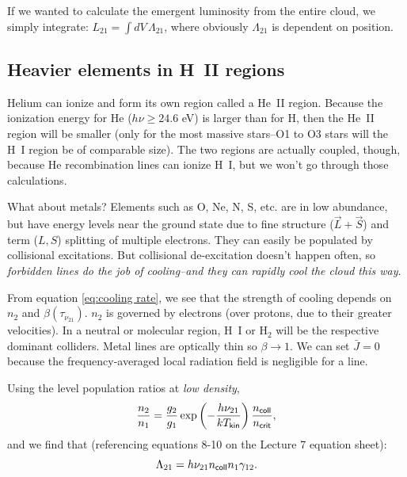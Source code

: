 \documentclass{tufte-handout}
\renewcommand{\rm}{\sf}
\newcommand{\HI}{\textnormal{H{\smaller~\textsc{I}}}}
\newcommand{\HII}{\textnormal{H{\smaller~\textsc{II}}}}
\renewcommand{\smallcaps}[1]{{\smaller~\textsc{#1}}}
\newcommand{\spec}[2]{\textnormal{#1}\smallcaps{#2}} %
\begin{document}
If we wanted to calculate the emergent luminosity from the entire cloud, we simply integrate: $L_{21} = \int dV\, \Lambda_{21}$, where obviously $\Lambda_{21}$ is dependent on position.

\subsection{Heavier elements in \HII{} regions}
Helium can ionize and form its own region called a \spec{He}{II} region. Because the ionization energy for He ($h\nu \geq 24.6$ eV) is larger than for H, then the \spec{He}{II} region will be smaller (only for the most massive stars--O1 to O3 stars will the \HI{} region be of comparable size). The two regions are actually coupled, though, because He recombination lines can ionize \HI, but we won't go through those calculations.

What about metals? Elements such as O, Ne, N, S, etc. are in low abundance, but have energy levels near the ground state due to fine structure ($\vec L + \vec S$) and term ($L, S$) splitting of multiple electrons. They can easily be populated by collisional excitations. But collisional de-excitation doesn't happen often, so \textit{forbidden lines do the job of cooling--and they can rapidly cool the cloud this way}.

From equation \eqref{eq:cooling rate}, we see that the strength of cooling depends on $n_2$ and $\beta(\tau_{\nu_{21}})$. $n_2$ is governed by electrons (over protons, due to their greater velocities). In a neutral or molecular region, \HI{} or H$_2$ will be the respective dominant colliders. Metal lines are optically thin so $\beta \rightarrow 1$. We can set $\bar J = 0$ because the frequency-averaged local radiation field is negligible for a line. 

Using the level population ratios at \textit{low density}, 
\begin{equation}
\frac{n_2}{n_1} = \frac{g_2}{g_1} \exp\left (- \frac{h\nu_{21}}{kT_{\rm kin}}\right )\frac{n_{\rm coll}}{n_{\rm crit}},
\end{equation}
and we find that (referencing equations 8-10 on the Lecture 7 equation sheet):
\begin{equation}\label{eq:low density cooling}
\Lambda_{21} = h\nu_{21} n_{\rm coll} n_1 \gamma_{12}.
\end{equation}
\end{document}
